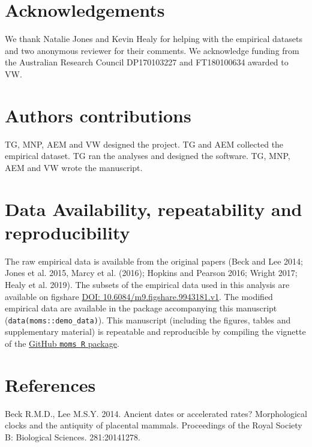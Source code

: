 \documentclass[]{article}
\begin{document}
\section{Acknowledgements}\label{acknowledgements}

We thank Natalie Jones and Kevin Healy for helping with the empirical
datasets and two anonymous reviewer for their comments. We acknowledge
funding from the Australian Research Council DP170103227 and FT180100634
awarded to VW.

\section{Authors contributions}\label{authors-contributions}

TG, MNP, AEM and VW designed the project. TG and AEM collected the
empirical dataset. TG ran the analyses and designed the software. TG,
MNP, AEM and VW wrote the manuscript.

\section{Data Availability, repeatability and
reproducibility}\label{data-availability-repeatability-and-reproducibility}

The raw empirical data is available from the original papers (Beck and
Lee 2014; Jones et al. 2015, Marcy et al. (2016); Hopkins and Pearson
2016; Wright 2017; Healy et al. 2019). The subsets of the empirical data
used in this analysis are available on figshare
\href{https://doi.org/10.6084/m9.figshare.9943181.v1}{DOI:
10.6084/m9.figshare.9943181.v1}. The modified empirical data are
available in the package accompanying this manuscript
(\texttt{data(moms::demo\_data)}). This manuscript (including the
figures, tables and supplementary material) is repeatable and
reproducible by compiling the vignette of the
\href{https://github/TGuillerme/moms}{GitHub \texttt{moms\ R} package}.

\section*{References}\label{references}

\hypertarget{refs}{}
\hypertarget{ref-beck2014}{}
Beck R.M.D., Lee M.S.Y. 2014. Ancient dates or accelerated rates?
Morphological clocks and the antiquity of placental mammals. Proceedings
of the Royal Society B: Biological Sciences. 281:20141278.
\end{document}
